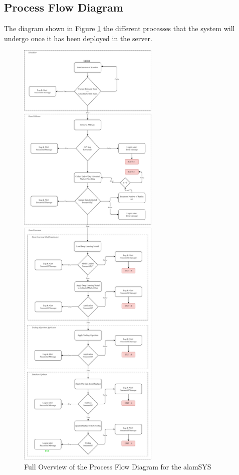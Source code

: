 \subsection{Process Flow Diagram}
\label{subsec:process_flow}
The diagram shown in Figure \ref{fig:process_flowchart} the different processes 
that the system will undergo once it has been deployed in the server.

\begin{figure}[ht]
    \centering
    \includegraphics[width=0.6\textwidth]{./assets/ProcessFlowchart.png}
    \caption{Full Overview of the Process Flow Diagram for the alamSYS}
    \label{fig:process_flowchart}
\end{figure}
\FloatBarrier

